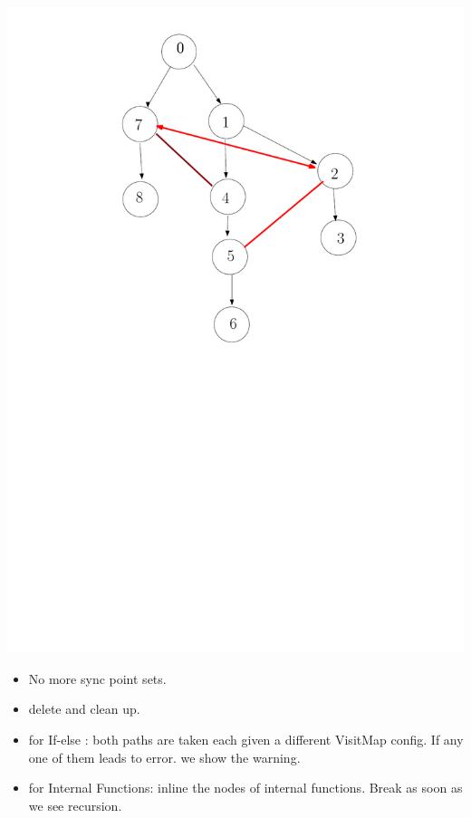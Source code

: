 \documentclass[12pt]{beamer}
\begin{document}
\begin{frame}[plain]
  \includegraphics[scale=0.3]{end.pdf}
  \begin{itemize}
  \item No more sync point sets.
  \item delete and clean up. 
  \end{itemize}
\end{frame}



\begin{frame}[plain]
  \begin{itemize}
  \item for If-else : both paths are taken each given a different VisitMap config. If
    any one of them leads to error. we show the warning.
  \item for Internal Functions: inline the nodes of internal functions. Break as soon as we see
    recursion.
  \end{itemize}
\end{frame}
\end{document}
